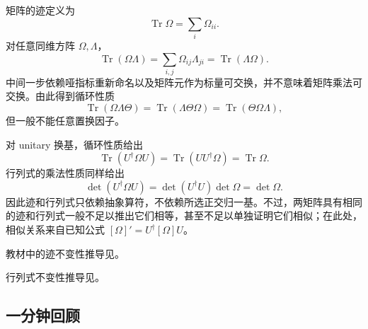 

矩阵的迹定义为
\[
  \operatorname{Tr}\Omega=\sum_i\Omega_{ii}.
\]
对任意同维方阵 $\Omega,\Lambda$，
\begin{equation}
  \operatorname{Tr}(\Omega\Lambda)
  =\sum_{i,j}\Omega_{ij}\Lambda_{ji}
  =\operatorname{Tr}(\Lambda\Omega).
  \label{eq:QM-C01-S07-trace-two-factor}
\end{equation}
中间一步依赖哑指标重新命名以及矩阵元作为标量可交换，并不意味着矩阵乘法可交换。由此得到循环性质
\begin{equation}
  \operatorname{Tr}(\Omega\Lambda\Theta)
  =\operatorname{Tr}(\Lambda\Theta\Omega)
  =\operatorname{Tr}(\Theta\Omega\Lambda),
  \label{eq:QM-C01-S07-trace-cyclic}
\end{equation}
但一般不能任意置换因子。

对 unitary 换基，循环性质给出
\begin{equation}
  \operatorname{Tr}(U^\dagger\Omega U)
  =\operatorname{Tr}(UU^\dagger\Omega)
  =\operatorname{Tr}\Omega.
  \label{eq:QM-C01-S07-trace-invariance}
\end{equation}
行列式的乘法性质同样给出
\begin{equation}
  \det(U^\dagger\Omega U)
  =\det(U^\dagger U)\det\Omega
  =\det\Omega.
  \label{eq:QM-C01-S07-determinant-invariance}
\end{equation}
因此迹和行列式只依赖抽象算符，不依赖所选正交归一基。不过，两矩阵具有相同的迹和行列式一般不足以推出它们相等，甚至不足以单独证明它们相似；在此处，相似关系来自已知公式 $[\Omega]'=U^\dagger[\Omega]U$。

教材中的迹不变性推导见。

行列式不变性推导见。

\subsection{一分钟回顾}

